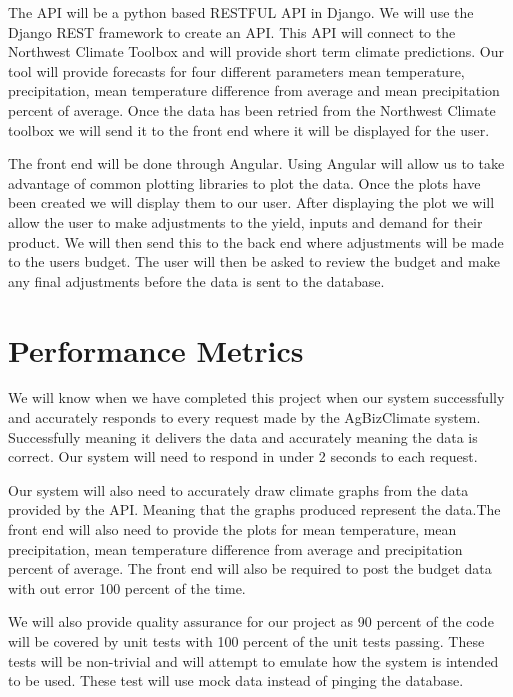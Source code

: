 \documentclass[letterpaper,10pt]{article}
\begin{document}
	The API will be a python based RESTFUL API in Django. We will use the Django REST framework to create an API. This API will connect to the Northwest Climate Toolbox and will provide short term climate predictions. Our tool will provide forecasts for four different parameters mean temperature, precipitation, mean temperature difference from average and mean precipitation percent of average. Once the data has been retried from the Northwest Climate toolbox we will send it to the front end where it will be displayed for the user.
	
	The front end will be done through Angular. Using Angular will allow us to take advantage of common plotting libraries to plot the data. Once the plots have been created we will display them to our user. After displaying the plot we will allow the user to make adjustments to the yield, inputs and demand for their product. We will then send this to the back end where adjustments will be made to the users budget. The user will then be asked to review the budget and make any final adjustments before the data is sent to the database.
		
\section {Performance Metrics}
		
		We will know when we have completed this project when our system successfully and accurately responds to every request made by the AgBizClimate system. Successfully meaning it delivers the data and accurately meaning the data is correct. Our system will need to respond in under 2 seconds to each request.
		
		Our system will also need to accurately draw climate graphs from the data provided by the API. Meaning that the graphs produced represent the data.The front end will also need to provide the plots for mean temperature, mean precipitation, mean temperature difference from average and precipitation percent of average. The front end will also be required to post the budget data with out error 100 percent of the time.
		
		We will also provide quality assurance for our project as 90 percent of the code will be covered by unit tests with 100 percent of the unit tests passing. These tests will be non-trivial and will attempt to emulate how the system is intended to be used. These test will use mock data instead of pinging the database.
\end{document}
